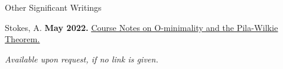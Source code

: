 \begin{rSection}{Other Significant Writings}
\begin{enumerate}[label={[\arabic*]}]
  \item Stokes, A. \textbf{May 2022.} \underline{\href{https://github.com/AlunStokes/MATH712Paper}{Course Notes on O-minimality and the Pila-Wilkie Theorem.}}
\end{enumerate}

\smallskip
\emph{Available upon request, if no link is given.} \hfill

\end{rSection}